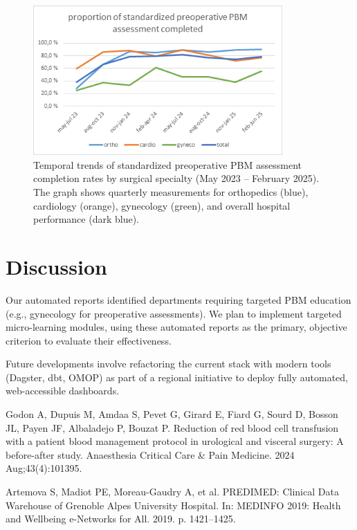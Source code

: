 \documentclass{IOS-Book-Article}
\begin{document}
\begin{figure}[h!]
\vspace{-1em}
\centering
\includegraphics[width=0.85\textwidth]{figure.png}
\caption{Temporal trends of standardized preoperative PBM assessment completion rates by surgical specialty (May 2023 -- February 2025). The graph shows quarterly measurements for orthopedics (blue), cardiology (orange), gynecology (green), and overall hospital performance (dark blue).}
\label{fig:pbm_trends}
\vspace{-1em}
\end{figure}

\section{Discussion}

Our automated reports identified departments requiring targeted PBM education 
(e.g., gynecology for preoperative assessments). We plan to implement targeted micro-learning modules,
using these automated reports as the primary, objective criterion to evaluate their effectiveness.

Future developments involve refactoring the current stack with modern tools (Dagster, dbt, OMOP) as part of a regional 
initiative to deploy fully automated, web-accessible dashboards.

\begin{thebibliography}{99}

Godon A, Dupuis M, Amdaa S, Pevet G, Girard E, Fiard G, Sourd D, Bosson JL, Payen JF, Albaladejo P, Bouzat P. Reduction of red blood cell transfusion with a patient blood management protocol in urological and visceral surgery: A before-after study. Anaesthesia Critical Care \& Pain Medicine. 2024 Aug;43(4):101395.

Artemova S, Madiot PE, Moreau-Gaudry A, et al. PREDIMED: Clinical Data Warehouse of Grenoble Alpes University Hospital. In: MEDINFO 2019: Health and Wellbeing e-Networks for All. 2019. p. 1421--1425.

\end{thebibliography}
\end{document}
